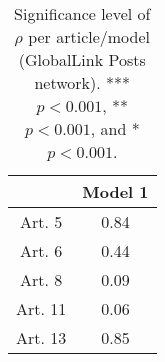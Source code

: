 \begin{table}[ht]
\centering
\begin{tabular}{cc}
  \toprule
 & Model 1 \\ 
  \midrule
Art. 5 & 0.84   \\ 
   \midrule
Art. 6 & 0.44   \\ 
   \midrule
Art. 8 & 0.09   \\ 
   \midrule
Art. 11 & 0.06   \\ 
   \midrule
Art. 13 & 0.85   \\ 
   \bottomrule
\end{tabular}
\caption{Significance level of $\rho$ per article/model (GlobalLink Posts network). *** $p < 0.001$, ** $p < 0.001$, and * $p < 0.001$.} 
\end{table}
